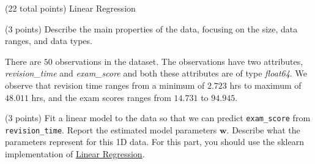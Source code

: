 \documentclass[12pt]{article}
\begin{document}
\maketitle
\thispagestyle{empty}







\clearpage

\begin{question}{(22 total points) Linear Regression}




%
%
\begin{subquestion}{(3 points) Describe the main properties of the data, focusing on the size, data ranges, and data types.   
}


\begin{answerbox}{10em}
There are $50$ observations in the dataset. The observations have two attributes, \textit{revision\_time} and \textit{exam\_score} and both these attributes are of type \textit{float64}. We observe that revision time ranges from a minimum of $2.723$ hrs to maximum of $48.011$ hrs, and the exam scores ranges from $14.731$ to $94.945$.
\end{answerbox}



\end{subquestion}




%
%
\begin{subquestion}{(3 points) Fit a linear model to the data so that we can predict \texttt{exam\_score} from \texttt{revision\_time}. 
Report the estimated model parameters $\mathbf{w}$. 
Describe what the parameters represent for this 1D data. 
For this part, you should use the sklearn implementation of \href{https://scikit-learn.org/0.19/modules/generated/sklearn.linear_model.LinearRegression.html}{Linear Regression}.\\
}



\end{subquestion}
\end{question}
\end{document}
